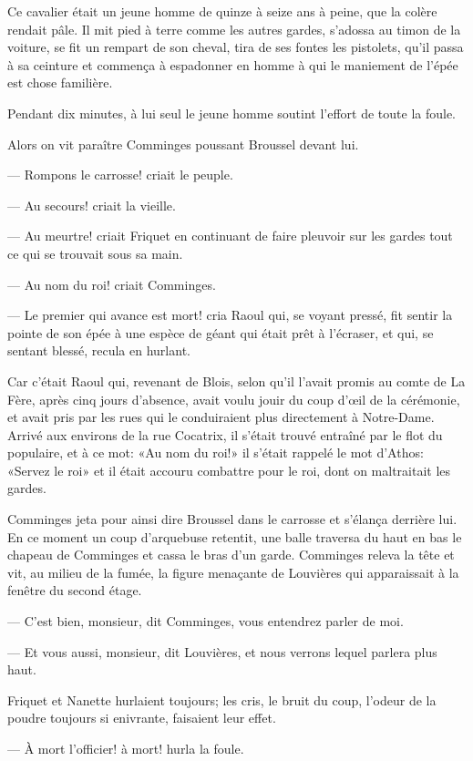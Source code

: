 Ce cavalier était un jeune homme de quinze à seize ans à peine, que la colère rendait pâle. Il mit pied à terre comme les autres gardes, s'adossa au timon de la voiture, se fit un rempart de son cheval, tira de ses fontes les pistolets, qu'il passa à sa ceinture et commença à espadonner en homme à qui le maniement de l'épée est chose familière.

Pendant dix minutes, à lui seul le jeune homme soutint l'effort de toute la foule.

Alors on vit paraître Comminges poussant Broussel devant lui.

— Rompons le carrosse! criait le peuple.

— Au secours! criait la vieille.

— Au meurtre! criait Friquet en continuant de faire pleuvoir sur les gardes tout ce qui se trouvait sous sa main.

— Au nom du roi! criait Comminges.

— Le premier qui avance est mort! cria Raoul qui, se voyant pressé, fit sentir la pointe de son épée à une espèce de géant qui était prêt à l'écraser, et qui, se sentant blessé, recula en hurlant.

Car c'était Raoul qui, revenant de Blois, selon qu'il l'avait promis au comte de La Fère, après cinq jours d'absence, avait voulu jouir du coup d'œil de la cérémonie, et avait pris par les rues qui le conduiraient plus directement à Notre-Dame. Arrivé aux environs de la rue Cocatrix, il s'était trouvé entraîné par le flot du populaire, et à ce mot: «Au nom du roi!» il s'était rappelé le mot d'Athos: «Servez le roi» et il était accouru combattre pour le roi, dont on maltraitait les gardes.

Comminges jeta pour ainsi dire Broussel dans le carrosse et s'élança derrière lui. En ce moment un coup d'arquebuse retentit, une balle traversa du haut en bas le chapeau de Comminges et cassa le bras d'un garde. Comminges releva la tête et vit, au milieu de la fumée, la figure menaçante de Louvières qui apparaissait à la fenêtre du second étage.

— C'est bien, monsieur, dit Comminges, vous entendrez parler de moi.

— Et vous aussi, monsieur, dit Louvières, et nous verrons lequel parlera plus haut.

Friquet et Nanette hurlaient toujours; les cris, le bruit du coup, l'odeur de la poudre toujours si enivrante, faisaient leur effet.

— À mort l'officier! à mort! hurla la foule.

